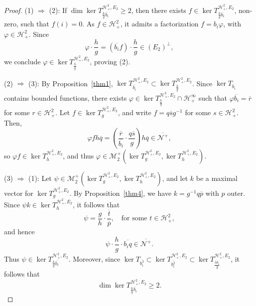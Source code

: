 \documentclass[10pt,a4paper]{amsart}
\begin{document}
\begin{proof}
(1) \( \Rightarrow \) (2): If \( \dim \ker T_{\frac{h}{g} \overline{b_i}}^{\mathcal{H}^2_+, E_2} \ge 2 \), then there exists \( f \in \ker T_{\frac{h}{g} \overline{b_i}}^{\mathcal{H}^2_+, E_2} \), non-zero, such that \( f(i) = 0 \). As \( f \in \mathcal{H}^2_+ \), it admits a factorization \( f = b_i \varphi \), with \( \varphi \in \mathcal{H}^2_+ \). Since
\[
\varphi \cdot \frac{h}{g} = \left( \overline{b_i} f \right) \cdot \frac{h}{g} \in (E_2)^\perp,
\]
we conclude \( \varphi \in \ker T_{\frac{h}{g}}^{\mathcal{H}^2_+, E_2} \), proving (2).

(2) \( \Rightarrow \) (3): By Proposition~\ref{thm1}, \( \ker T_{\overline{b_i}}^{\mathcal{H}^2_+, E_2} \subset \ker T_{\frac{h}{g}}^{\mathcal{H}^2_+, E_2} \). Since \( \ker T_{\overline{b_i}} \) contains bounded functions, there exists \( \varphi \in \ker T_{\frac{h}{g}}^{\mathcal{H}^2_+, E_2} \cap \mathcal{H}_+^\infty \) such that \( \varphi \overline{b_i} = \overline{r} \) for some \( r \in \mathcal{H}^2_+ \). Let \( f \in \ker T_g^{\mathcal{H}^2_+, E_2} \), and write \( f = q\overline{s} g^{-1} \) for some \( s \in \mathcal{H}^2_+ \). Then,
\[
\varphi f h \overline{q} = \left( \frac{\overline{r}}{\overline{b_i}} \cdot \frac{q \overline{s}}{g} \right) h \overline{q} \in \overline{\mathcal{N}^+},
\]
so \( \varphi f \in \ker T_h^{\mathcal{H}^2_+, E_2} \), and thus \( \varphi \in \mathcal{M}_2^+(\ker T_g^{\mathcal{H}^2_+, E_2}, \ker T_h^{\mathcal{H}^2_+, E_2}) \).

(3) \( \Rightarrow \) (1): Let \( \psi \in \mathcal{M}_2^+(\ker T_g^{\mathcal{H}^2_+, E_2}, \ker T_h^{\mathcal{H}^2_+, E_2}) \), and let \( k \) be a maximal vector for \( \ker T_g^{\mathcal{H}^2_+, E_2} \). By Proposition~\ref{thm4}, we have \( k = g^{-1} q \overline{p} \) with \( p \) outer. Since \( \psi k \in \ker T_h^{\mathcal{H}^2_+, E_2} \), it follows that
\[
\psi = \frac{g}{h} \cdot \frac{\overline{t}}{\overline{p}}, \quad \text{for some } t \in \mathcal{H}^2_+,
\]
and hence
\[
\psi \cdot \frac{h}{g} \cdot \overline{b_i q} \in \overline{\mathcal{N}^+}.
\]
Thus \( \psi \in \ker T_{\frac{h}{g} \overline{b_i}}^{\mathcal{H}^2_+, E_2} \). Moreover, since \( \ker T_{\overline{b_i^2}} \subset \ker T_{\overline{b_i^2}}^{\mathcal{H}^2_+, E_2} \subset \ker T_{\frac{h \overline{b_i}}{g}}^{\mathcal{H}^2_+, E_2} \), it follows that
\[
\dim \ker T_{\frac{h}{g} \overline{b_i}}^{\mathcal{H}^2_+, E_2} \ge 2.
\]
\end{proof}
\end{document}
